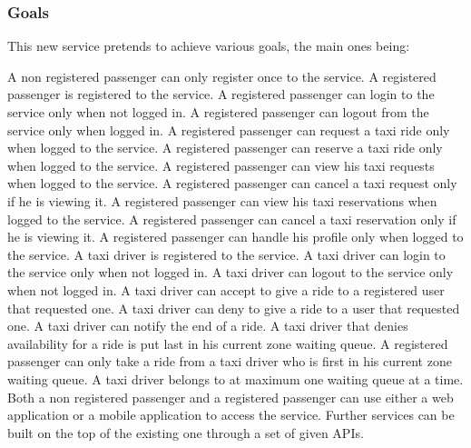 \subsubsection{Goals}
This new service pretends to achieve various goals, the main ones being:
\begin{itemize}
	 A non registered passenger can only register once to the service.
	 A registered passenger is registered to the service.
	 A registered passenger can login to the service only when not logged in.
	 A registered passenger can logout from the service only when logged in.
	 A registered passenger can request a taxi ride only when logged to the service.
	 A registered passenger can reserve a taxi ride only when logged to the service.
	 A registered passenger can view his taxi requests when logged to the service.
	 A registered passenger can cancel a taxi request only if he is viewing it.
	 A registered passenger can view his taxi reservations when logged to the service.
	 A registered passenger can cancel a taxi reservation only if he is viewing it.
	 A registered passenger can handle his profile only when logged to the service.
	 A taxi driver is registered to the service.
	 A taxi driver can login to the service only when not logged in.
	 A taxi driver can logout to the service only when not logged in.
	 A taxi driver can accept to give a ride to a registered user that requested one.
	 A taxi driver can deny to give a ride to a user that requested one.
	 A taxi driver can notify the end of a ride.
	 A taxi driver that denies availability for a ride is put last in his current zone waiting queue.
	 A registered passenger can only take a ride from a taxi driver who is first in his current zone waiting queue.
	 A taxi driver belongs to at maximum one waiting queue at a time.
	 Both a non registered passenger and a registered passenger can use either a web application or a mobile application to access the service.
	 Further services can be built on the top of the existing one through a set of given APIs.
\end{itemize}

